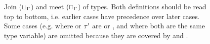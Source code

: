 \begin{figure}
\footnotesize
{}
\caption{Join ($\sqcup_{\Gamma}$) and meet ($\sqcap_{\Gamma}$) of types.
Both definitions should be read top to bottom, i.e. earlier cases have
precedence over later cases.
Some cases (e.g. where \ty or $\tau'$ are \tybot or \tyany, 
and where both are the same type variable)
are omitted because they are covered by  and 
\subtydflt{\ty'}{\ty}.}\label{fig:ty-join-meet}
\end{figure}



